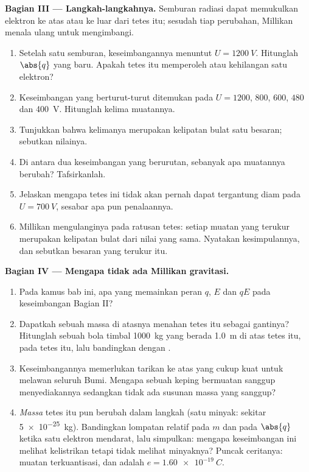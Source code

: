 \begin{problem}
\medskip
\noindent\textbf{Bagian III --- Langkah-langkahnya.}
Semburan radiasi dapat memukulkan elektron ke atas atau ke luar dari
tetes itu; sesudah tiap perubahan, Millikan menala ulang 
untuk mengimbangi.
\begin{enumerate}[resume]
  \item Setelah satu semburan, keseimbangannya menuntut
        $U = \qty{1200}{V}$. Hitunglah $\abs{q}$ yang baru. Apakah tetes
        itu memperoleh atau kehilangan satu elektron?
  \item Keseimbangan yang berturut-turut ditemukan pada $U = 1200$,
        $800$, $600$, $480$ dan \qty{400}{V}. Hitunglah kelima
        muatannya.
  \item Tunjukkan bahwa kelimanya merupakan kelipatan bulat satu
        besaran; sebutkan nilainya.
  \item Di antara dua keseimbangan yang berurutan, sebanyak apa
        muatannya berubah? Tafsirkanlah.
  \item Jelaskan mengapa tetes ini tidak akan pernah dapat tergantung
        diam pada $U = \qty{700}{V}$, sesabar apa pun penalaannya.
  \item Millikan mengulanginya pada ratusan tetes: setiap muatan yang
        terukur merupakan kelipatan bulat dari nilai yang sama.
        Nyatakan kesimpulannya, dan sebutkan besaran yang terukur itu.
\end{enumerate}

\medskip
\noindent\textbf{Bagian IV --- Mengapa tidak ada Millikan gravitasi.}
\begin{enumerate}[resume]
  \item Pada kamus bab ini, apa yang memainkan peran $q$, $E$ dan $qE$
        pada keseimbangan Bagian II?
  \item Dapatkah sebuah massa di atasnya menahan tetes itu sebagai
        gantinya? Hitunglah  sebuah bola timbal \qty{1000}{kg} yang
        berada \qty{1.0}{m} di atas tetes itu,  pada tetes itu,
        lalu bandingkan dengan .
  \item Keseimbangannya memerlukan tarikan ke atas yang cukup kuat
        untuk melawan seluruh Bumi. Mengapa sebuah keping bermuatan
        sanggup menyediakannya sedangkan tidak ada susunan massa yang
        sanggup?
  \item \emph{Massa} tetes itu pun berubah dalam langkah (satu 
        minyak: sekitar \qty{5e-25}{kg}). Bandingkan lompatan relatif
        pada $m$ dan pada $\abs{q}$ ketika satu elektron mendarat, lalu
        simpulkan: mengapa keseimbangan ini melihat  kelistrikan
        tetapi tidak melihat  minyaknya? Puncak ceritanya: muatan
        terkuantisasi, dan  adalah $e = \qty{1.60e-19}{C}$.
\end{enumerate}
\end{problem}
